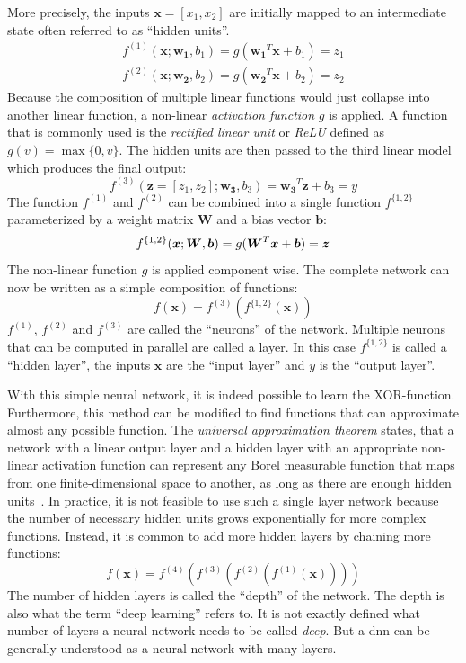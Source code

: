 More precisely, the inputs $\boldsymbol{x} = [x_1,x_2]$ are initially mapped to an intermediate state often referred to as \enquote{hidden units}.
\begin{align*}
    f^{(1)}(\boldsymbol{x}; \boldsymbol{w_1}, b_1) = g(\boldsymbol{w_1}^T \boldsymbol{x} + b_{1}) = z_1 \\
    f^{(2)}(\boldsymbol{x}; \boldsymbol{w_2}, b_2) = g(\boldsymbol{w_2}^T \boldsymbol{x} + b_{2}) = z_2
\end{align*}
Because the composition of multiple linear functions would just collapse into another linear function, a non-linear \textit{activation function} $g$ is applied.
A function that is commonly used is the \textit{rectified linear unit} or \textit{ReLU} defined as $g(v) = \max\{0, v\}$.
The hidden units are then passed to the third linear model which produces the final output:
\[
    f^{(3)}(\boldsymbol{z} = [z_1, z_2]; \boldsymbol{w_3}, b_3) = \boldsymbol{w_3}^T \boldsymbol{z} + b_{3} = y
\]
The function $f^{(1)}$ and $f^{(2)}$ can be combined into a single function $f^{\{1, 2\}}$ parameterized by a weight matrix $\boldsymbol{W}$ and a bias vector $\boldsymbol{b}$:
\[
    f^{\{1, 2\}}(\boldsymbol{x}; \boldsymbol{W}, \boldsymbol{b}) = g(\boldsymbol{W}^T \boldsymbol{x}+ \boldsymbol{b}) = \boldsymbol{z} \\
\]
The non-linear function $g$ is applied component wise.
The complete network can now be written as a simple composition of functions:
\[
f(\boldsymbol{x}) = f^{(3)}(f^{\{1, 2\}}(\boldsymbol{x}))
\]
$f^{(1)}$, $f^{(2)}$ and $f^{(3)}$ are called the \enquote{neurons} of the network.
Multiple neurons that can be computed in parallel are called a layer.
In this case $f^{\{1, 2\}}$ is called a \enquote{hidden layer}, the inputs $\boldsymbol{x}$ are the \enquote{input layer} and $y$ is the \enquote{output layer}.

With this simple neural network, it is indeed possible to learn the XOR-function.
Furthermore, this method can be modified to find functions that can approximate almost any possible function.
The \textit{universal approximation theorem} states, that a network with a linear output layer and a hidden layer with an appropriate non-linear activation function can represent any Borel measurable function that maps from one finite-dimensional space to another, as long as there are enough hidden units~\autocite{Goodfellow-et-al-2016}.
In practice, it is not feasible to use such a single layer network because the number of necessary hidden units grows exponentially for more complex functions.
Instead, it is common to add more hidden layers by chaining more functions:
\[
    f(\boldsymbol{x}) = f^{(4)}(f^{(3)}(f^{(2)}(f^{(1)}(\boldsymbol{x}))))
\]
The number of hidden layers is called the \enquote{depth} of the network.
The depth is also what the term \enquote{deep learning} refers to.
It is not exactly defined what number of layers a neural network needs to be called \textit{deep}.
But a \acrlong{dnn} can be generally understood as a neural network with many layers.

